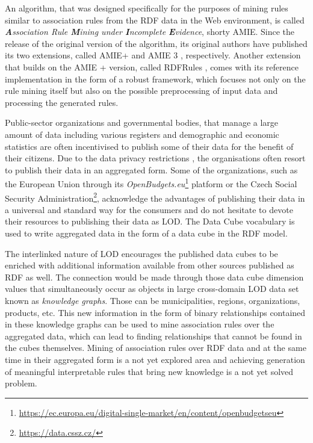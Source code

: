 An algorithm, that was designed specifically for the purposes of mining rules similar to association rules from the RDF data in the Web environment, is called \textit{\textbf{A}ssociation Rule \textbf{M}ining under \textbf{I}ncomplete \textbf{E}vidence}, shorty AMIE. \cite{Galarraga2013} Since the release of the original version of the algorithm, its original authors have published its two extensions, called AMIE+ \cite{Galarraga2015} and AMIE 3 \cite{Galarraga2020}, respectively. Another extension that builds on the AMIE + version, called RDFRules \cite{Zeman2020}, comes with its reference implementation in the form of a robust framework, which focuses not only on the rule mining itself but also on the possible preprocessing of input data and processing the generated rules.

Public-sector organizations and governmental bodies, that manage a large amount of data including various registers and demographic and economic statistics are often incentivised to publish some of their data for the benefit of their citizens. Due to the data privacy restrictions \cite{gdpr162_2020}, the organisations often resort to publish their data in an aggregated form. Some of the organizations, such as the European Union through its \textit{OpenBudgets.eu}\footnote{\href{https://ec.europa.eu/digital-single-market/en/content/openbudgetseu}{https://ec.europa.eu/digital-single-market/en/content/openbudgetseu}} platform or the Czech Social Security Administration\footnote{\href{https://data.cssz.cz/}{https://data.cssz.cz/}}, acknowledge the advantages of publishing their data in a universal and standard way for the consumers and do not hesitate to devote their resources to publishing their data as LOD. The Data Cube vocabulary \cite{dcv2014} is used to write aggregated data in the form of a data cube in the RDF model.

The interlinked nature of LOD encourages the published data cubes to be enriched with additional information available from other sources published as RDF as well. The connection would be made through those data cube dimension values that simultaneously occur as objects in large cross-domain LOD data set known as \textit{knowledge graphs}. Those can be municipalities, regions, organizations, products, etc. This new information in the form of binary relationships contained in these knowledge graphs can be used to mine association rules over the aggregated data, which can lead to finding relationships that cannot be found in the cubes themselves. Mining of association rules over RDF data and at the same time in their aggregated form is a not yet explored area and achieving generation of meaningful interpretable rules that bring new knowledge is a not yet solved problem.

